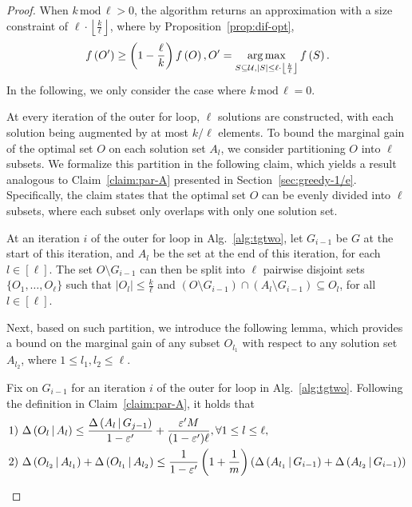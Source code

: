 \begin{proof}
When $k\,\text{mod}\,\ell > 0$, the algorithm returns an approximation with a size constraint of 
$\ell\cdot\left\lfloor \frac{k}{\ell}\right\rfloor$, where by Proposition~\ref{prop:dif-opt},
\begin{equation}\label{inq:tgtwo-dif-opt}
f \left( O' \right) \ge \left(1-\frac{\ell}{k}\right)f \left( O \right), 
O' = \operatorname*{arg\,max}\limits_{S\subseteq \mathcal U, |S|\le \ell\cdot \left\lfloor \frac{k}{\ell} \right\rfloor}f \left( S \right).
\end{equation}
In the following, we only consider the case where $k\,\text{mod}\,\ell = 0$.

At every iteration of the outer for loop,
$\ell$ solutions are constructed, with each solution being augmented
by at most $k/\ell$ elements.
To bound the marginal gain of the optimal set $O$ on each solution set $A_l$,
we consider partitioning $O$ into $\ell$ subsets.
We formalize this partition in the following claim,
which yields a result analogous to Claim~\ref{claim:par-A} presented in 
Section~\ref{sec:greedy-1/e}.
Specifically, the claim states that the optimal set $O$ can be evenly 
divided into $\ell$ subsets,
where each subset only overlaps with only one solution set.
\begin{claim}
At an iteration $i$ of the outer for loop in Alg.~\ref{alg:tgtwo},
let $G_{i-1}$ be $G$ at the start of this iteration,
and $A_{l}$ be the set at the end of this iteration,
for each $l\in [\ell]$.
The set $O\setminus G_{i-1}$ can then be split into $\ell$ pairwise disjoint sets $\{O_1, \ldots, O_\ell\}$
such that $|O_l| \le\frac{k}{\ell}$ and $\left(O\setminus G_{i-1}\right) \cap \left(A_{l}\setminus G_{i-1}\right) \subseteq O_l$, for all $l \in [\ell]$.
\end{claim}
Next, based on such partition, we introduce the following lemma, 
which provides a bound on the marginal gain of any subset $O_{l_1}$ 
with respect to any solution set $A_{l_2}$,
where $1\le l_1, l_2 \le \ell$.
\begin{lemma}\label{lemma:tg-par-A}
Fix on $G_{i-1}$ for an iteration $i$ of the outer for loop in Alg.~\ref{alg:tgtwo}.
Following the definition in Claim~\ref{claim:par-A}, it holds that
\begin{align*}
\text{1) }&\marge{O_{l}}{A_{l}}\le \frac{\marge{A_{l}}{G_{j-1}}}{1-\epsi'}+\frac{\epsi' M}{(1-\epsi')\ell}, \forall 1\le l \le \ell,\\
\text{2) }&\marge{O_{l_2}}{A_{l_1}} + \marge{O_{l_1}}{A_{l_2}} \le \frac{1}{1-\epsi'}\left(1+\frac{1}{m}\right)\left(\marge{A_{l_1}}{G_{i-1}}+\marge{A_{l_2}}{G_{i-1}}\right)

\end{align*}
\end{lemma}
\end{proof}
